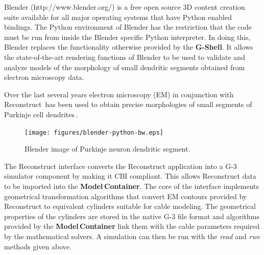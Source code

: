 \documentclass[12pt]{article}
\begin{document}
Blender (http://www.blender.org/) is a free open source 3D content
creation suite available for all major operating systems that have
Python enabled bindings.  The Python environment of Blender has the
restriction that the code must be run from inside the Blender specific
Python interpreter. In doing this, Blender replaces the functionality otherwise
provided by the {\bf G-Shell}. It allows the state-of-the-art rendering
functions of Blender to be used to validate and analyze models of the morphology
of small dendritic segments obtained from electron microscopy data.

Over the last several years electron microscopy (EM) in conjunction
with Reconstruct\,\cite{jc05:_recon} has been used to obtain precise
morphologies of small segments of Purkinje cell
dendrites\,\cite{huo09:_purkin, cornelis08:_model_neuros_genes}.

\begin{figure}[ht]
  \centering
    \texttt{[image: figures/blender-python-bw.eps]}
  \caption{Blender image of Purkinje neuron dendritic segment.}
  \label{fig:cbi-blender}
\end{figure}


The Reconstruct interface converts the Reconstruct application
into a G-3 simulator component by making it CBI compliant. This allows
Reconstruct data to be imported into the {\bf Model\,Container}.
The core of the interface implements geometrical transformation
algorithms that convert EM contours provided by Reconstruct to
equivalent cylinders suitable for cable modeling.
The geometrical properties of the cylinders are stored in the native
G-3 file format and algorithms provided by the {\bf Model\,Container}
link them with the cable parameters required by the mathematical
solvers.  A simulation can then be run with the {\it read} and {\it
  run} methods given above.
\end{document}
